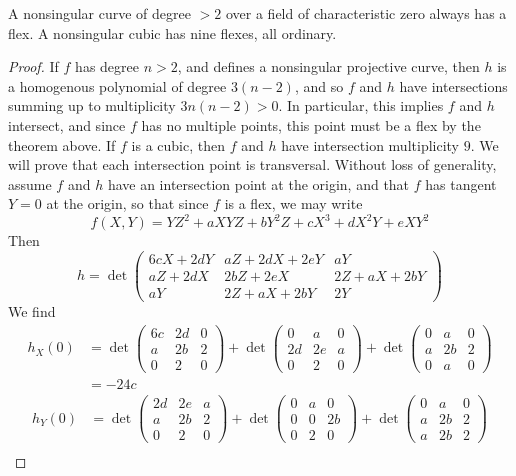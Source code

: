 \begin{corollary}
    A nonsingular curve of degree $> 2$ over a field of characteristic zero always has a flex. A nonsingular cubic has nine flexes, all ordinary.
\end{corollary}
\begin{proof}
    If $f$ has degree $n > 2$, and defines a nonsingular projective curve, then $h$ is a homogenous polynomial of degree $3(n-2)$, and so $f$ and $h$ have intersections summing up to multiplicity $3n(n-2) > 0$. In particular, this implies $f$ and $h$ intersect, and since $f$ has no multiple points, this point must be a flex by the theorem above. If $f$ is a cubic, then $f$ and $h$ have intersection multiplicity $9$. We will prove that each intersection point is transversal. Without loss of generality, assume $f$ and $h$ have an intersection point at the origin, and that $f$ has tangent $Y = 0$ at the origin, so that since $f$ is a flex, we may write
    \[ f(X,Y) = YZ^2 + aXYZ + bY^2Z + cX^3 + dX^2Y + eXY^2 \]
    Then
    \[ h = \det \begin{pmatrix} 6cX + 2dY & aZ + 2dX + 2eY & aY \\ aZ + 2dX & 2bZ + 2eX & 2Z + aX + 2bY \\ aY & 2Z + aX + 2bY & 2Y \end{pmatrix} \]
    We find
    \begin{align*}
        h_X(0) &= \det \begin{pmatrix} 6c & 2d & 0 \\ a & 2b & 2 \\ 0 & 2 & 0 \end{pmatrix} + \det \begin{pmatrix} 0 & a & 0 \\ 2d & 2e & a \\ 0 & 2 & 0 \end{pmatrix} + \det \begin{pmatrix} 0 & a & 0 \\ a & 2b & 2 \\ 0 & a & 0 \end{pmatrix}\\
        &= -24c
    \end{align*}
    \begin{align*}
        h_Y(0) &= \det \begin{pmatrix} 2d & 2e & a \\ a & 2b & 2 \\ 0 & 2 & 0 \end{pmatrix} + \det \begin{pmatrix} 0 & a & 0 \\ 0 & 0 & 2b \\ 0 & 2 & 0 \end{pmatrix} + \det \begin{pmatrix} 0 & a & 0 \\ a & 2b & 2 \\ a & 2b & 2 \end{pmatrix}\\

\end{align*}
\end{proof}
